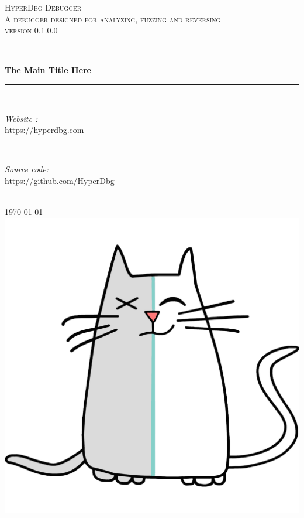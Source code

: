 \documentclass[12pt]{reporthyperdbg}
\begin{document}
\begin{titlepage}

\newcommand{\HLine}{\rule{\linewidth}{0.5mm}} %

\center %
 

\textsc{\LARGE HyperDbg Debugger}\\[1.5cm] 
\textsc{\Large A debugger designed for analyzing, fuzzing and reversing
}\\[0.5cm] 
\textsc{\large version 0.1.0.0}\\[0.5cm] 


\HLine \\[0.4cm]
{ \huge \bfseries The Main Title Here}\\[0.4cm] %
\HLine \\[1.5cm]
 

\begin{minipage}{0.4\textwidth}
\begin{flushleft} \large
\emph{Website :}\\
\url{https://hyperdbg.com} 
\end{flushleft}
\end{minipage}
~
\begin{minipage}{0.4\textwidth}
\begin{flushright} \large
\emph{Source code:} \\
\url{https://github.com/HyperDbg}
\end{flushright}
\end{minipage}\\[2cm]



{\large \today}\\[2cm] 

\includegraphics[scale=0.1]{hyperdbgcat.png}\\[1cm]

\vfill 

\end{titlepage}
\end{document}
